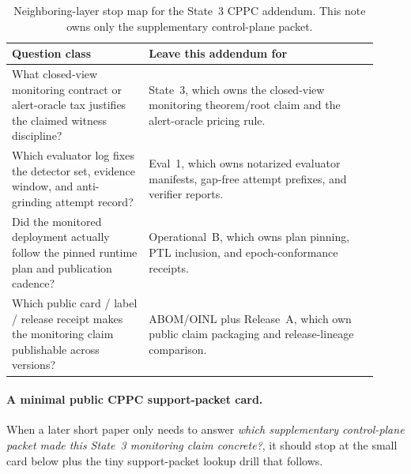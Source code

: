 \documentclass[11pt]{article}
\theoremstyle{definition}
\theoremstyle{remark}
\begin{document}
\begin{table}[H]
\centering
\begin{tabular}{@{}p{0.34\linewidth}p{0.58\linewidth}@{}}
\toprule
Question class & Leave this addendum for \\
\midrule
What closed-view monitoring contract or alert-oracle tax justifies the claimed witness discipline? & State~3, which owns the closed-view monitoring theorem/root claim and the alert-oracle pricing rule. \\
Which evaluator log fixes the detector set, evidence window, and anti-grinding attempt record? & Eval~1, which owns notarized evaluator manifests, gap-free attempt prefixes, and verifier reports. \\
Did the monitored deployment actually follow the pinned runtime plan and publication cadence? & Operational~B, which owns plan pinning, PTL inclusion, and epoch-conformance receipts. \\
Which public card / label / release receipt makes the monitoring claim publishable across versions? & ABOM/OINL plus Release~A, which own public claim packaging and release-lineage comparison. \\
\bottomrule
\end{tabular}
\caption{Neighboring-layer stop map for the State~3 CPPC addendum. This note owns only the supplementary control-plane packet.}
\label{tab:cppc-addendum-stopmap}
\end{table}

\paragraph{A minimal public CPPC support-packet card.}
When a later short paper only needs to answer \emph{which supplementary control-plane packet made this State~3 monitoring claim concrete?}, it should stop at the small card below plus the tiny support-packet lookup drill that follows.
\end{document}
